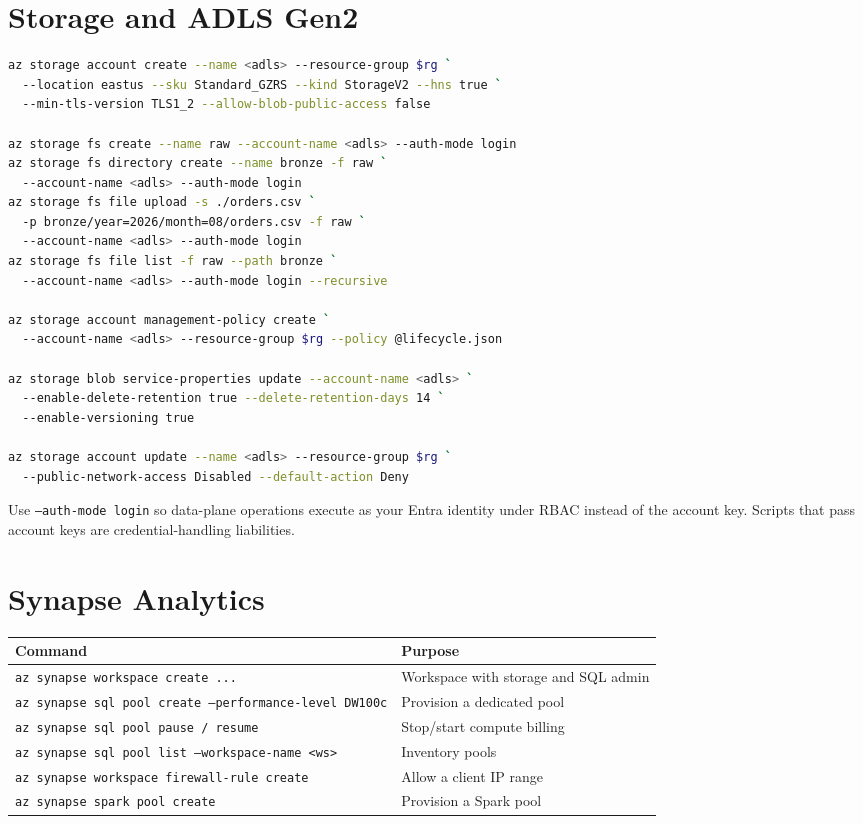 \section{Storage and ADLS Gen2}

\begin{lstlisting}[language=bash,caption={Core ADLS Gen2 lifecycle commands.},label={lst:app-cli-storage}]
az storage account create --name <adls> --resource-group $rg `
  --location eastus --sku Standard_GZRS --kind StorageV2 --hns true `
  --min-tls-version TLS1_2 --allow-blob-public-access false

az storage fs create --name raw --account-name <adls> --auth-mode login
az storage fs directory create --name bronze -f raw `
  --account-name <adls> --auth-mode login
az storage fs file upload -s ./orders.csv `
  -p bronze/year=2026/month=08/orders.csv -f raw `
  --account-name <adls> --auth-mode login
az storage fs file list -f raw --path bronze `
  --account-name <adls> --auth-mode login --recursive

az storage account management-policy create `
  --account-name <adls> --resource-group $rg --policy @lifecycle.json

az storage blob service-properties update --account-name <adls> `
  --enable-delete-retention true --delete-retention-days 14 `
  --enable-versioning true

az storage account update --name <adls> --resource-group $rg `
  --public-network-access Disabled --default-action Deny
\end{lstlisting}

\begin{tipbox}
Use \texttt{--auth-mode login} so data-plane operations execute as your Entra
identity under RBAC instead of the account key. Scripts that pass account keys
are credential-handling liabilities.
\end{tipbox}

\section{Synapse Analytics}

\begin{center}
\footnotesize
\begin{tabular}{@{}p{7.2cm}p{6.2cm}@{}}
\toprule
\textbf{Command} & \textbf{Purpose} \\
\midrule
\texttt{az synapse workspace create ...} & Workspace with storage and SQL admin \\
\texttt{az synapse sql pool create --performance-level DW100c} & Provision a dedicated pool \\
\texttt{az synapse sql pool pause / resume} & Stop/start compute billing \\
\texttt{az synapse sql pool list --workspace-name <ws>} & Inventory pools \\
\texttt{az synapse workspace firewall-rule create} & Allow a client IP range \\
\texttt{az synapse spark pool create} & Provision a Spark pool \\
\bottomrule
\end{tabular}
\end{center}

